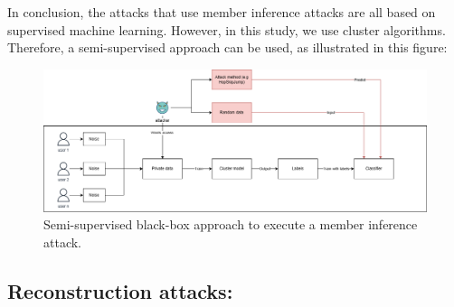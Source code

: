 In conclusion, the attacks that use member inference attacks are all based on supervised machine learning.
However, in this study, we use cluster algorithms.
Therefore, a semi-supervised approach can be used, as illustrated in this figure:

\begin{figure}[h]
  \label{figure:MIA-semi-supervised}
  \includegraphics[width=1\textwidth]{TheorethicalFramework/Differential privacy/master-thesis-MIA.png}
  \caption{Semi-supervised black-box approach to execute a member inference attack.}
\end{figure}

\subsection{Reconstruction attacks:}

